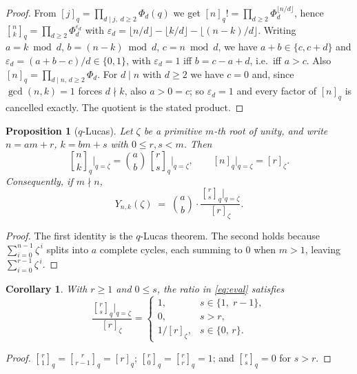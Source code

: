 \documentclass[11pt,a4paper]{article}
\theoremstyle{plain}
\newtheorem{proposition}[theorem]{Proposition}
\newtheorem{corollary}[theorem]{Corollary}
\theoremstyle{definition}
\theoremstyle{remark}
\newcommand{\qint}[1]{[#1]_q}
\newcommand{\qbin}[2]{\genfrac[]{0pt}{}{#1}{#2}_{q}}
\begin{document}
\begin{proof}
From $\qint{j}=\prod_{d\mid j,\;d\ge2}\Phi_d(q)$ we get
$\qint{n}!=\prod_{d\ge2}\Phi_d^{\lfloor n/d\rfloor}$, hence
$\qbin{n}{k}=\prod_{d\ge2}\Phi_d^{\varepsilon_d}$ with
$\varepsilon_d=\lfloor n/d\rfloor-\lfloor k/d\rfloor-\lfloor (n-k)/d\rfloor$.
Writing $a=k\bmod d$, $b=(n-k)\bmod d$, $c=n\bmod d$, we have $a+b\in\{c,c+d\}$ and
$\varepsilon_d=(a+b-c)/d\in\{0,1\}$, with $\varepsilon_d=1$ iff $b=c-a+d$, i.e.\ iff $a>c$.
Also $\qint{n}=\prod_{d\mid n,\,d\ge2}\Phi_d$. For $d\mid n$ with $d\ge2$ we have
$c=0$ and, since $\gcd(n,k)=1$ forces $d\nmid k$, also $a>0=c$; so $\varepsilon_d=1$ and
every factor of $\qint{n}$ is cancelled exactly. The quotient is the stated product.
\end{proof}

\begin{proposition}[$q$-Lucas]\label{prop:lucas}
Let $\zeta$ be a primitive $m$-th root of unity, and write $n=am+r$, $k=bm+s$ with
$0\le r,s<m$. Then
\[
  \qbin{n}{k}\Big|_{q=\zeta}=\binom{a}{b}\,\qbin{r}{s}\Big|_{q=\zeta},
  \qquad
  \qint{n}\Big|_{q=\zeta}=[r]_{\zeta}.
\]
Consequently, if $m\nmid n$,
\begin{equation}\label{eq:eval}
  Y_{n,k}(\zeta)\;=\;\binom{a}{b}\cdot\frac{\qbin{r}{s}\big|_{q=\zeta}}{[r]_\zeta}.
\end{equation}
\end{proposition}

\begin{proof}
The first identity is the $q$-Lucas theorem. The second holds because
$\sum_{i=0}^{n-1}\zeta^{\,i}$ splits into $a$ complete cycles, each summing to $0$ when
$m>1$, leaving $\sum_{i=0}^{r-1}\zeta^{\,i}$.
\end{proof}

\begin{corollary}\label{cor:rational}
With $r\ge1$ and $0\le s$, the ratio in \eqref{eq:eval} satisfies
\[
  \frac{\qbin{r}{s}\big|_{q=\zeta}}{[r]_\zeta}
  =\begin{cases}
    1, & s\in\{1,\;r-1\},\\[2pt]
    0, & s>r,\\[2pt]
    1/[r]_\zeta, & s\in\{0,\,r\}.
  \end{cases}
\]
\end{corollary}

\begin{proof}
$\qbin{r}{1}=\qbin{r}{r-1}=\qint{r}$; $\qbin{r}{0}=\qbin{r}{r}=1$; and $\qbin{r}{s}=0$ for
$s>r$.
\end{proof}
\end{document}
